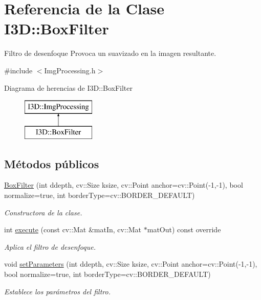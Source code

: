 \hypertarget{class_i3_d_1_1_box_filter}{}\section{Referencia de la Clase I3D\+:\+:Box\+Filter}
\label{class_i3_d_1_1_box_filter}


Filtro de desenfoque Provoca un suavizado en la imagen resultante.  




{\ttfamily \#include $<$Img\+Processing.\+h$>$}

Diagrama de herencias de I3D\+:\+:Box\+Filter\begin{figure}[H]
\begin{center}
\leavevmode
\includegraphics[height=2.000000cm]{class_i3_d_1_1_box_filter}
\end{center}
\end{figure}
\subsection*{Métodos públicos}
\begin{DoxyCompactItemize}
\item 
\hyperlink{class_i3_d_1_1_box_filter_a9b4a1eae6fd00f282c831becf3e5b923}{Box\+Filter} (int ddepth, cv\+::\+Size ksize, cv\+::\+Point anchor=cv\+::\+Point(-\/1,-\/1), bool normalize=true, int border\+Type=cv\+::\+B\+O\+R\+D\+E\+R\+\_\+\+D\+E\+F\+A\+U\+LT)
\begin{DoxyCompactList}\small\item\em Constructora de la clase. \end{DoxyCompactList}\item 
int \hyperlink{class_i3_d_1_1_box_filter_aaea2d395620162626a7b16b85ae44c42}{execute} (const cv\+::\+Mat \&mat\+In, cv\+::\+Mat $\ast$mat\+Out) const  override
\begin{DoxyCompactList}\small\item\em Aplica el filtro de desenfoque. \end{DoxyCompactList}\item 
void \hyperlink{class_i3_d_1_1_box_filter_a41f1b6c62f43fab9571432d0852a2a41}{set\+Parameters} (int ddepth, cv\+::\+Size ksize, cv\+::\+Point anchor=cv\+::\+Point(-\/1,-\/1), bool normalize=true, int border\+Type=cv\+::\+B\+O\+R\+D\+E\+R\+\_\+\+D\+E\+F\+A\+U\+LT)
\begin{DoxyCompactList}\small\item\em Establece los parámetros del filtro. \end{DoxyCompactList}\end{DoxyCompactItemize}
